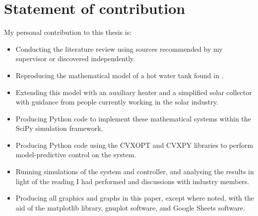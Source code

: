 \chapter{Statement of contribution}

My personal contribution to this thesis is:

\begin{itemize}
	\item Conducting the literature review using sources recommended by my supervisor or discovered independently.
	\item Reproducing the mathematical model of a hot water tank found in \textcite{Cristofari02}.
	\item Extending this model with an auxiliary heater and a simplified solar collector with guidance from people currently working in the solar industry.
	\item Producing Python code to implement these mathematical systems within the SciPy simulation framework.
	\item Producing Python code using the CVXOPT and CVXPY libraries to perform model-predictive control on the system.
	\item Running simulations of the system and controller, and analysing the results in light of the reading I had performed and discussions with industry members.
	\item Producing all graphics and graphs in this paper, except where noted, with the aid of the matplotlib library, gnuplot software, and Google Sheets software.
\end{itemize}

